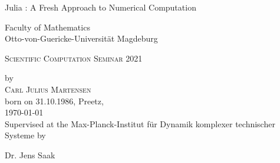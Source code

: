 %
%
%

\begin{titlepage}
  \begin{center}
    \vspace*{1,5cm}
    \begin{Large}
      \doublespacing
      \begin{scshape}
        Julia : A Fresh Approach to Numerical Computation
      \end{scshape}
      \singlespacing
    \end{Large}
    \vspace{\fill}
    Faculty of Mathematics\\
    Otto-von-Guericke-Universität Magdeburg\\
    \vspace{\fill}
    \begin{Large}
      \textsc{Scientific Computation Seminar 2021}
      \\
    \end{Large}
    \vspace{\fill}

    by\\
    \textsc{Carl Julius Martensen}\\
    born on 31.10.1986, Preetz,\\
    \today\\
    \vspace{\fill} Supervised at the Max-Planck-Institut für Dynamik komplexer
    technischer Systeme
    by\\
    \begin{scshape}
      Dr. Jens Saak
    \end{scshape}
  \end{center}
\end{titlepage}


